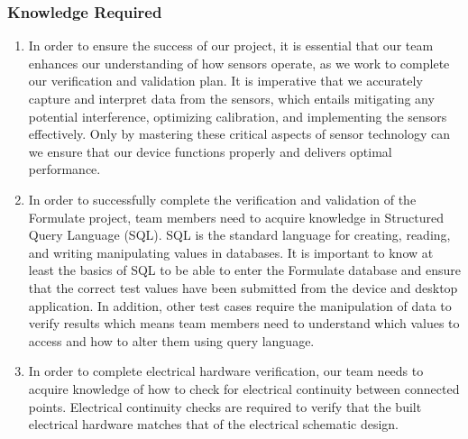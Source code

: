 \documentclass[12pt, titlepage]{article}
\begin{document}
\subsubsection{Knowledge Required}
  \begin{enumerate}
    \item In order to ensure the success of our project, it is essential that our team enhances our understanding of how sensors operate, as we work to complete our verification and validation plan. It is imperative that we accurately capture and interpret data from the sensors, which entails mitigating any potential interference, optimizing calibration, and implementing the sensors effectively. Only by mastering these critical aspects of sensor technology can we ensure that our device functions properly and delivers optimal performance.
    \item In order to successfully complete the verification and validation of the Formulate project, team members need to acquire knowledge in Structured Query Language (SQL). SQL is the standard language for creating, reading, and writing manipulating values in databases. It is important to know at least the basics of SQL to be able to enter the Formulate database and ensure that the correct test values have been submitted from the device and desktop application. In addition, other test cases require the manipulation of data to verify results which means team members need to understand which values to access and how to alter them using query language.
    \item In order to complete electrical hardware verification, our team needs to acquire knowledge of how to check for electrical continuity between connected points. Electrical continuity checks are required to verify that the built electrical hardware matches that of the electrical schematic design.
  \end{enumerate}
\end{document}
